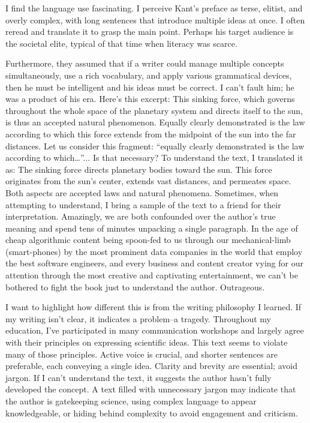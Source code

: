 I find the language use fascinating. I perceive Kant's preface as terse, elitist, and overly complex, with long sentences that introduce multiple ideas at once. I often reread and translate it to grasp the main point. Perhaps his target audience is the societal elite, typical of that time when literacy was scarce.

Furthermore, they assumed that if a writer could manage multiple concepts simultaneously, use a rich vocabulary, and apply various grammatical devices, then he must be intelligent and his ideas must be correct. I can't fault him; he was a product of his era. Here's this excerpt:
This sinking force, which governs throughout the whole space of the planetary system and directs itself to the sun, is thus an accepted natural phenomenon. Equally clearly demonstrated is the law according to which this force extends from the midpoint of the sun into the far distances.
Let us consider this fragment: “equally clearly demonstrated is the law according to which…”... Is that necessary? To understand the text, I translated it as: The sinking force directs planetary bodies toward the sun. This force originates from the sun's center, extends vast distances, and permeates space. Both aspects are accepted laws and natural phenomena. Sometimes, when attempting to understand, I bring a sample of the text to a friend for their interpretation. Amazingly, we are both confounded over the author's true meaning and spend tens of minutes unpacking a single paragraph. In the age of cheap algorithmic content being spoon-fed to us through our mechanical-limb (smart-phones) by the most prominent data companies in the world that employ the best software engineers, and every business and content creator vying for our attention through the most creative and captivating entertainment, we can't be bothered to fight the book just to understand the author. Outrageous. 

I want to highlight how different this is from the writing philosophy I learned. If my writing isn't clear, it indicates a problem–a tragedy. Throughout my education, I've participated in many communication workshops and largely agree with their principles on expressing scientific ideas. This text seems to violate many of those principles. Active voice is crucial, and shorter sentences are preferable, each conveying a single idea. Clarity and brevity are essential; avoid jargon. If I can't understand the text, it suggests the author hasn't fully developed the concept. A text filled with unnecessary jargon may indicate that the author is gatekeeping science, using complex language to appear knowledgeable, or hiding behind complexity to avoid engagement and criticism.

